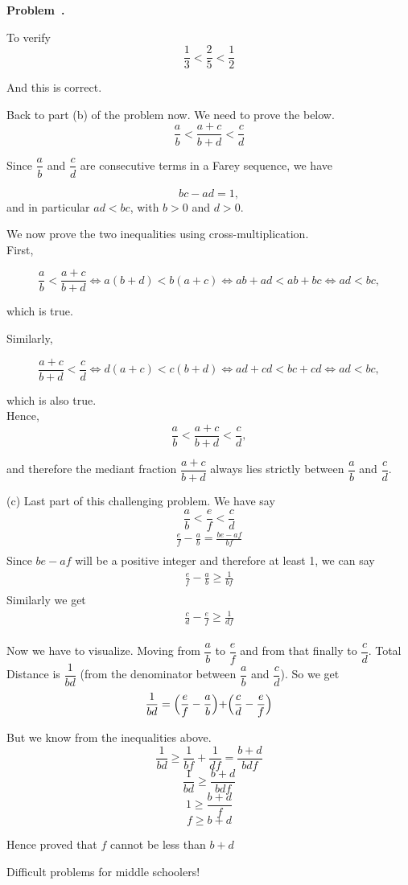 \documentclass[10pt]{article}
\newcounter{problem}
\newenvironment{problem}[1][]{
  \refstepcounter{problem}
  \par\noindent\textbf{Problem~\theproblem. #1}\par
  \vspace{0.5em}
}{\vspace{1em}}
\begin{document}
\begin{problem}
To verify
\[
\frac{1}{3} < \frac{2}{5} < \frac{1}{2}
\]

And this is correct.

Back to part (b) of the problem now. We need to prove the below.
\[
\frac{a}{b} < \frac{a + c}{b + d}<\frac{c}{d}
\]

Since $\dfrac{a}{b}$ and $\dfrac{c}{d}$ are consecutive terms in a Farey sequence,
we have

\[
bc - ad = 1,
\]
and in particular $ad < bc$, with $b>0$ and $d>0$.

We now prove the two inequalities using cross-multiplication.\\

First,

\[
\dfrac{a}{b} < \dfrac{a+c}{b+d}
\iff a(b+d) < b(a+c)
\iff ab + ad < ab + bc
\iff ad < bc,
\]

which is true.

Similarly,

\[
\dfrac{a+c}{b+d} < \dfrac{c}{d}
\iff d(a+c) < c(b+d)
\iff ad + cd < bc + cd
\iff ad < bc,
\]

which is also true.\\

Hence,
\[
\frac{a}{b} < \frac{a+c}{b+d}<\frac{c}{d},
\]

and therefore the mediant fraction $\dfrac{a+c}{b+d}$ always lies strictly between
$\dfrac{a}{b}$ and $\dfrac{c}{d}$.

(c) Last part of this challenging problem. We have say
\[
\frac{a}{b} < \frac{e}{f}<\frac{c}{d}
\]
\begin{gather*}
\frac{e}{f} - \frac{a}{b} = \frac{be - af}{bf}\\
\end{gather*}
Since $be - af$  will be a positive integer and therefore at least 1, we can say
\begin{gather*}
\frac{e}{f} - \frac{a}{b} \ge \frac{1}{bf}\\
\end{gather*}
Similarly we get
\begin{gather*}
\frac{c}{d} - \frac{e}{f} \ge \frac{1}{df}\\
\end{gather*}

Now we have to visualize. Moving from $\dfrac{a}{b}$ to $\dfrac{e}{f}$ and from that finally to $\dfrac{c}{d}$.
Total Distance is $\dfrac{1}{bd}$ (from the denominator between $\dfrac{a}{b}$ and $\dfrac{c}{d}$). So we get
\[
\frac{1}{bd} = \Bigl( \frac{e}{f} - \frac{a}{b} \Bigl) + \Bigl( \frac{c}{d} - \frac{e}{f} \Bigl)
\]

But we know from the inequalities above.
\[
\frac{1}{bd} \ge  \frac{1}{bf} + \frac{1}{df} = \frac{b + d}{bdf}
\]
\[
\frac{1}{bd} \ge  \frac{b + d}{bdf}
\]
\[
1 \ge  \frac{b + d}{f}
\]
\[
f \ge  b + d
\]

Hence proved that $f$ cannot be less than $b + d$

Difficult problems for middle schoolers!
\end{problem}
\end{document}

